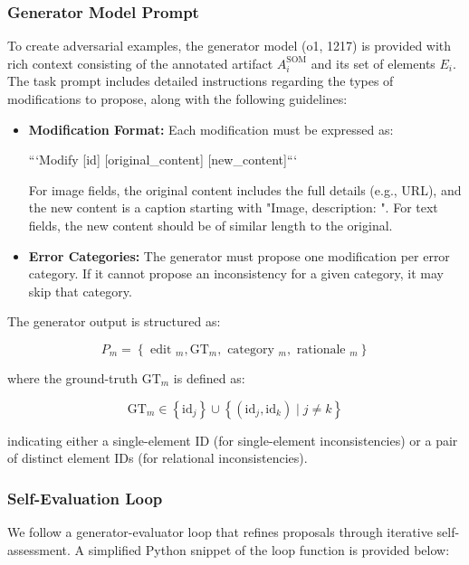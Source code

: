 \subsubsection{Generator Model Prompt}

To create adversarial examples, the generator model (o1, 1217) is provided with rich context consisting of the annotated artifact $A_i^{\text{SOM}}$ and its set of elements $E_i$. The task prompt includes detailed instructions regarding the types of modifications to propose, along with the following guidelines:

\begin{itemize}
    \item \textbf{Modification Format:} Each modification must be expressed as: 

    ```Modify [id] [original\_content] [new\_content]```

    For image fields, the original content includes the full details (e.g., URL), and the new content is a caption starting with "Image, description: ". For text fields, the new content should be of similar length to the original.

    \item \textbf{Error Categories:} The generator must propose one modification per error category. If it cannot propose an inconsistency for a given category, it may skip that category.
\end{itemize}

The generator output is structured as:

$$P_m=\left\{\text { edit }_m, \mathrm{GT}_m, \text { category }{ }_m, \text { rationale }_m\right\}$$

where the ground-truth $\mathrm{GT}_m$ is defined as:

$$\mathrm{GT}_m \in\left\{\mathrm{id}_j\right\} \cup\left\{\left(\mathrm{id}_j, \mathrm{id}_k\right) \mid j \neq k\right\}$$

indicating either a single-element ID (for single-element inconsistencies) or a pair of distinct element IDs (for relational inconsistencies).

\subsubsection{Self-Evaluation Loop}
We follow a generator-evaluator loop that refines proposals through iterative self-assessment. A simplified Python snippet of the loop function is provided below:

